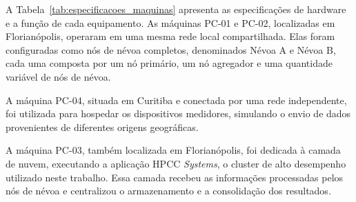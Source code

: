A Tabela~\ref{tab:especificacoes_maquinas} apresenta as especificações de hardware e a função de cada equipamento. As máquinas PC-01 e PC-02, localizadas em Florianópolis, operaram em uma mesma rede local compartilhada. Elas foram configuradas como nós de névoa completos, denominados Névoa A e Névoa B, cada uma composta por um nó primário, um nó agregador e uma quantidade variável de nós de névoa.

A máquina PC-04, situada em Curitiba e conectada por uma rede independente, foi utilizada para hospedar os dispositivos medidores, simulando o envio de dados provenientes de diferentes origens geográficas.

A máquina PC-03, também localizada em Florianópolis, foi dedicada à camada de nuvem, executando a aplicação \gls{HPCC} \textit{Systems}, o cluster de alto desempenho utilizado neste trabalho. Essa camada recebeu as informações processadas pelos nós de névoa e centralizou o armazenamento e a consolidação dos resultados.

